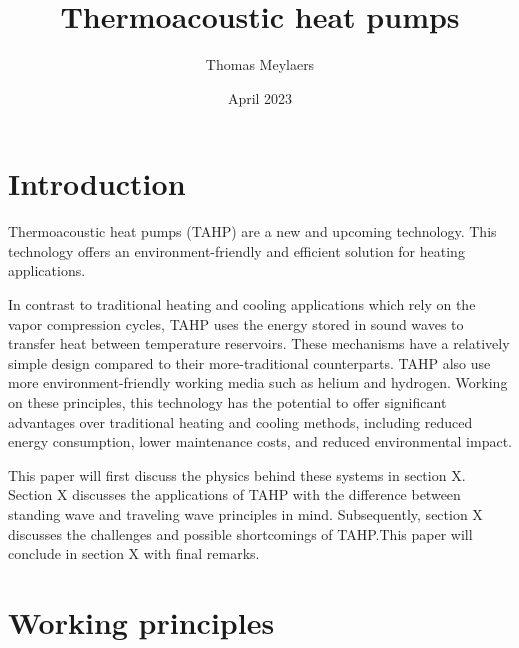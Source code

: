 \documentclass[a4paper]{article}
\title{Thermoacoustic heat pumps}
\author{Thomas Meylaers}
\date{April 2023}
\newcommand{\newpara}
    {
      \bigbreak{}
      \noindent
    }
\begin{document}
\maketitle

\newpage

\begin{abstract}

\end{abstract}

\newpage

\tableofcontents

\newpage


\section{Introduction} %
Thermoacoustic heat pumps (TAHP) are a new and upcoming technology. This technology offers an environment-friendly and efficient solution for heating applications.
\newpara{}
In contrast to traditional heating and cooling applications which rely on the vapor compression cycles, TAHP uses the energy stored in sound waves to transfer heat between temperature reservoirs. These mechanisms have a relatively simple design compared to their more-traditional counterparts. TAHP also use more environment-friendly working media such as helium and hydrogen.
Working on these principles, this technology has the potential to offer significant advantages over traditional heating and cooling methods, including reduced energy consumption, lower maintenance costs, and reduced environmental impact.\cite{powerofsound}
\newpara{}
This paper will first discuss the physics behind these systems in section X. Section X discusses the applications of TAHP with the difference between standing wave and traveling wave principles in mind. Subsequently, section X discusses the challenges and possible shortcomings of TAHP.\@ This paper will conclude in section X with final remarks.

\section{Working principles}
\end{document}
